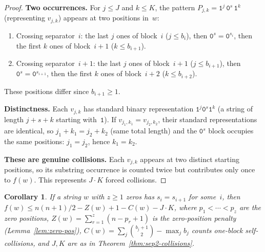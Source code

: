 \documentclass[11pt,a4paper]{article}
\theoremstyle{plain}
\newtheorem{corollary}[theorem]{Corollary}
\theoremstyle{definition}
\theoremstyle{remark}
\begin{document}
\begin{proof}
  \textbf{Two occurrences.}
  For $j \le J$ and $k \le K$, the pattern
  $P_{j,k} = \mathtt{1}^j\,\mathtt{0}^s\,\mathtt{1}^k$ (representing
  $v_{j,k}$) appears at two positions in~$w$:
  \begin{enumerate}[nosep]
    \item Crossing separator~$i$: the last $j$ ones of
      block~$i$ ($j \le b_i$), then $\mathtt{0}^s = \mathtt{0}^{s_i}$,
      then the first $k$ ones of block~$i{+}1$ ($k \le b_{i+1}$).
    \item Crossing separator~$i{+}1$: the last
      $j$ ones of block~$i{+}1$ ($j \le b_{i+1}$), then
      $\mathtt{0}^s = \mathtt{0}^{s_{i+1}}$, then the first
      $k$ ones of block~$i{+}2$ ($k \le b_{i+2}$).
  \end{enumerate}
  These positions differ since $b_{i+1} \ge 1$.

  \textbf{Distinctness.}
  Each $v_{j,k}$ has standard binary representation
  $\mathtt{1}^j\mathtt{0}^s\mathtt{1}^k$ (a string of length
  $j + s + k$ starting with~$\mathtt{1}$).  If
  $v_{j_1,k_1} = v_{j_2,k_2}$, their standard representations are
  identical, so $j_1 + k_1 = j_2 + k_2$ (same total length) and the
  $\mathtt{0}^s$ block occupies the same positions: $j_1 = j_2$,
  hence $k_1 = k_2$.

  \textbf{These are genuine collisions.}
  Each $v_{j,k}$ appears at two distinct starting positions, so its
  substring occurrence is counted twice but contributes only once to
  $f(w)$.  This represents $J \cdot K$ forced collisions.
\end{proof}

\begin{corollary}\label{cor:sep2-deficit}
  If a string $w$ with $z \ge 1$ zeros has $s_i = s_{i+1}$ for some~$i$,
  then
  $f(w) \le n(n{+}1)/2 - Z(w) + 1 - C(w) - J \cdot K$,
  where $p_1<\cdots<p_z$ are the zero positions,
  $Z(w) = \sum_{r=1}^z(n - p_r + 1)$ is the zero-position penalty
  (Lemma~\ref{lem:zero-pos}),
  $C(w) = \sum_j \binom{b_j+1}{2} - \max_j b_j$ counts one-block
  self-collisions, and $J, K$ are as in
  Theorem~\ref{thm:sep2-collisions}.
\end{corollary}
\end{document}
